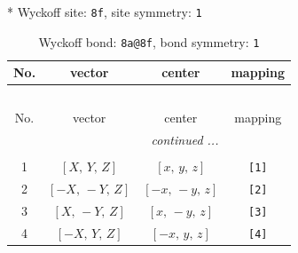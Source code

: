\documentclass[fleqn,8pt]{jsarticle}
\begin{document}
* Wyckoff site: {\tt 8f}, site symmetry: {\tt 1}
\renewcommand{\arraystretch}{1.2}
\begin{longtable}{cccc}
\caption{Wyckoff bond: {\tt 8a@8f}, bond symmetry: {\tt 1}}
 \\
 \hline \hline
No. & vector & center & mapping \\ \hline \endfirsthead

\multicolumn{3}{l}{\tablename\ \thetable{}} \\
 \hline \hline
No. & vector & center & mapping \\ \hline \endhead

 \hline \hline
\multicolumn{3}{r}{\footnotesize\it continued ...} \\ \endfoot

 \hline \hline
\multicolumn{3}{r}{} \\ \endlastfoot

1 & $\left[ X,\, Y,\, Z \right]$ & $\left[ x,\, y,\, z \right]$ & {\tt [1]} \\ \hline
2 & $\left[ - X,\, - Y,\, Z \right]$ & $\left[ - x,\, - y,\, z \right]$ & {\tt [2]} \\ \hline
3 & $\left[ X,\, - Y,\, Z \right]$ & $\left[ x,\, - y,\, z \right]$ & {\tt [3]} \\ \hline
4 & $\left[ - X,\, Y,\, Z \right]$ & $\left[ - x,\, y,\, z \right]$ & {\tt [4]} \\
\end{longtable}
\end{document}
